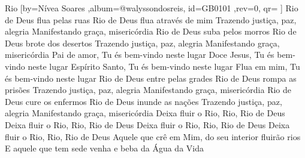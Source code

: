 \beginsong
{Rio %
}[by={Nívea Soares %
},album={@walyssondosreis},
id={GB0101 %
},rev={0}, %
qr={ %
}]
\beginverse*
Rio de Deus flua pelas ruas
Rio de Deus flua através de mim
Trazendo justiça, paz, alegria
Manifestando graça, misericórdia
\endverse
\beginverse*
Rio de Deus suba pelos morros
Rio de Deus brote dos desertos
Trazendo justiça, paz, alegria
Manifestando graça, misericórdia
\endverse
\beginchorus
Pai de amor, Tu és bem-vindo neste lugar
Doce Jesus, Tu és bem-vindo neste lugar
Espírito Santo, Tu és bem-vindo neste lugar
Flua em mim, Tu és bem-vindo neste lugar
\endchorus
\beginverse*
Rio de Deus entre pelas grades
Rio de Deus rompa as prisões
Trazendo justiça, paz, alegria
Manifestando graça, misericórdia
\endverse
\beginverse*
Rio de Deus cure os enfermos
Rio de Deus inunde as nações
Trazendo justiça, paz, alegria
Manifestando graça, misericórdia
\endverse
\beginverse*
Deixa fluir o Rio, Rio, Rio de Deus
Deixa fluir o Rio, Rio, Rio de Deus
Deixa fluir o Rio, Rio, Rio de Deus
Deixa fluir o Rio, Rio, Rio de Deus
\endverse
\beginverse*
Aquele que crê em Mim, do seu interior fluirão rios
E aquele que tem sede venha e beba da Água da Vida
\endverse

